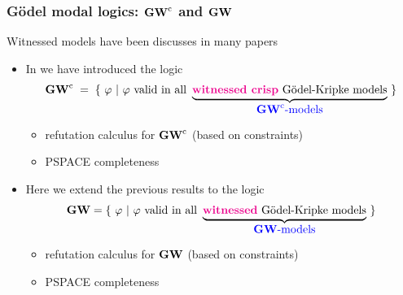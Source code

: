 

\begin{frame}\frametitle{G\"odel modal logics:  $\mathbf{GW}^\mathrm{c}$ and  $\mathbf{GW}$ }

  Witnessed models have been discusses in many papers

  \MSK

 
  \begin{itemize}
\item  In   we have introduced the logic
    \[
 \mathbf{GW}^\mathrm{c}\;=\;\{~\varphi~|~\varphi~\mbox{valid in all}~
  \underbrace{\mbox{{\bf \color{magenta} witnessed crisp} G\"odel-Kripke models}}_{\mbox{{\color{blue} $\mathbf{GW}^\mathrm{c}$-models}}}~\}
      \]
      \begin{itemize}
      \item[$\surd$] refutation calculus for   $\mathbf{GW}^\mathrm{c}$ (based on constraints)
 \item[$\surd$]  PSPACE completeness 
        \end{itemize}

      

\medskip
\item Here we extend the previous results to the logic      
  \[
  \mathbf{GW}  =\{~\varphi~|~\varphi~\mbox{valid in all}~
  \underbrace{\mbox{{\bf \color{magenta} witnessed} G\"odel-Kripke models}}_{\mbox{{\color{blue} $\mathbf{GW}$-models}}}~\}
\]

  \begin{itemize}
      \item[$\surd$] refutation calculus for   $\mathbf{GW}$ (based on constraints)
 \item[$\surd$]  PSPACE completeness 
        \end{itemize}

\end{itemize}

  \VFILL
  
\end{frame}




